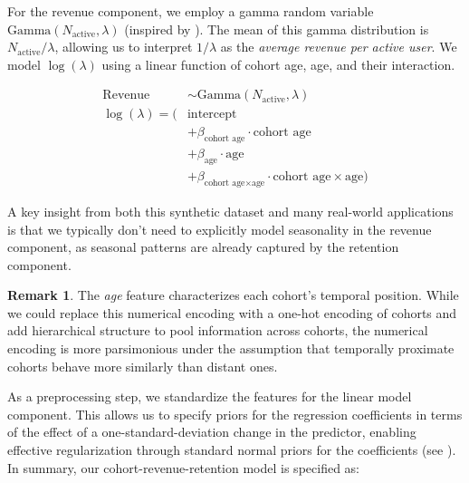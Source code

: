 \documentclass[11pt]{amsart}
\theoremstyle{definition}
\newtheorem{remark}{Remark}
\begin{document}
For the revenue component, we employ a gamma random variable $\text{Gamma}(N_{\text{active}}, \lambda)$ (inspired by
\cite{stucchio2015bayesian}). The mean of this gamma distribution is $N_{\text{active}} / \lambda$, allowing us to interpret
$1 / \lambda$ as the {\em average revenue per active user}. We model $\log(\lambda)$ using a linear function of cohort age,
age, and their interaction.

\begin{align*}
    \text{Revenue}    & \sim \text{Gamma}(N_{\text{active}}, \lambda)                                            \\
    \log(\lambda) = ( & \text{intercept}                                                                         \\
                      & + \beta_{\text{cohort age}} \cdot \text{cohort age}                                      \\
                      & + \beta_{\text{age}} \cdot \text{age}                                                    \\
                      & + \beta_{\text{cohort age} \times \text{age}} \cdot \text{cohort age} \times \text{age})
\end{align*}

A key insight from both this synthetic dataset and many real-world applications is that we typically don't need to explicitly
model seasonality in the revenue component, as seasonal patterns are already captured by the retention component.

\begin{remark}
    The {\em age} feature characterizes each cohort's temporal position. While we could replace this numerical encoding with
    a one-hot encoding of cohorts and add hierarchical structure to pool information across cohorts, the numerical encoding
    is more parsimonious under the assumption that temporally proximate cohorts behave more similarly than distant ones.
\end{remark}

As a preprocessing step, we standardize the features for the linear model component. This allows us to specify priors for the
regression coefficients in terms of the effect of a one-standard-deviation change in the predictor, enabling effective
regularization through standard normal priors for the coefficients (see \cite{orduz_retention_bart}). \\

In summary, our cohort-revenue-retention model is specified as:
\end{document}
